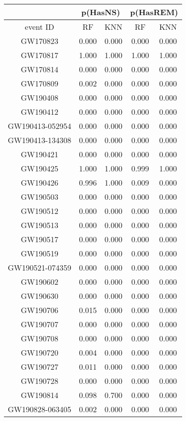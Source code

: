 \begin{table*}[]
\centering
\begin{tabular}{c|cc|cc}
\hline
 & \multicolumn{2}{c}{p(HasNS)} & \multicolumn{2}{c}{p(HasREM)} \\
 \hline
event ID & RF & KNN & RF & KNN \\
\hline 
\hline
GW170823 &	0.000 &	0.000 & 0.000 &	0.000 \\
GW170817 &	1.000 &	1.000 & 1.000 & 1.000 \\
GW170814 &	0.000 &	0.000 & 0.000 & 0.000 \\
GW170809 &	0.002 & 0.000 & 0.000 & 0.000 \\
GW190408 &	0.000 &	0.000 & 0.000 & 0.000 \\
GW190412 &	0.000 &	0.000 & 0.000 & 0.000 \\
GW190413-052954 & 0.000  & 0.000 & 0.000 & 0.000 \\
GW190413-134308 & 0.000 &	0.000 & 0.000 & 0.000 \\
GW190421 &	0.000 &	0.000 & 0.000 & 0.000 \\
GW190425 &	1.000  & 1.000 &	0.999 & 1.000 \\
GW190426 &	0.996  & 1.000 & 0.009 & 0.000 \\
GW190503 &	0.000 &	0.000 & 0.000 & 0.000 \\
GW190512 &  0.000 &	0.000 & 0.000 & 0.000 \\
GW190513 &	0.000 &	0.000 & 0.000 & 0.000 \\
GW190517 &	0.000 &	0.000 & 0.000 & 0.000 \\
GW190519 &	0.000 &	0.000 & 0.000 & 0.000 \\
GW190521-074359  &	0.000 &	0.000 & 0.000 & 0.000 \\
GW190602 &	0.000 &	0.000 & 0.000 & 0.000 \\
GW190630 &	0.000 &	0.000 & 0.000 & 0.000 \\
GW190706 & 0.015 &	0.000 &	0.000 &	0.000 \\ 
GW190707 & 0.000 & 0.000 &	0.000 &	0.000 \\
GW190708 & 0.000 &	0.000 &	0.000 &	0.000 \\
GW190720 & 0.004 &	0.000 &	0.000 &	0.000 \\
GW190727 & 0.011 &	0.000 &	0.000 &	0.000 \\
GW190728 & 0.000 &	0.000 &	0.000 &	0.000 \\
GW190814 & 0.098 &	0.700 &	0.000 & 0.000 \\
GW190828-063405 & 0.002 &	0.000 &	0.000 & 0.000 \\

\end{tabular}
\end{table*}
